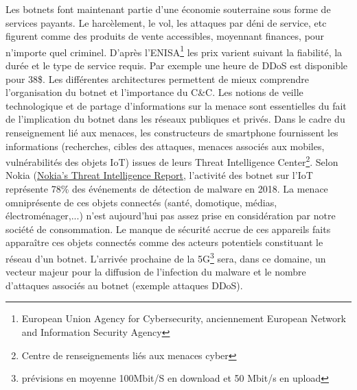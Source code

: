 Les botnets font maintenant partie d'une économie souterraine sous forme de services payants.
Le harcèlement, le vol, les attaques par déni de service, etc figurent comme des produits de vente accessibles, moyennant finances, pour n'importe quel criminel.
\newline D'après l'ENISA\footnote{European Union Agency for Cybersecurity, anciennement European Network and Information Security Agency} les prix varient suivant la fiabilité, la durée et le type de service requis.
Par exemple une heure de DDoS est disponible pour 38\$.
Les différentes architectures permettent de mieux comprendre l'organisation du botnet et l'importance du C\&C.
\vspace{5mm}
\newline Les notions de veille technologique et de partage d'informations sur la menace sont essentielles du fait de l'implication du botnet dans les réseaux publiques et privés.
\newline Dans le cadre du renseignement lié aux menaces, les constructeurs de smartphone fournissent les informations (recherches, cibles des attaques, menaces associés aux mobiles, vulnérabilités des objets IoT) issues de leurs Threat Intelligence Center\footnote{Centre de renseignements liés aux menaces cyber}.
\vspace{5mm}
\newline Selon Nokia (\href{https://www.nokia.com/about-us/news/releases/2018/12/04/nokias-threat-intelligence-report-2019-warns-on-the-fast-growing-and-evolving-threat-of-malicious-software-targeting-internet-of-things-iot-devices/}{Nokia's Threat Intelligence Report}, l'activité des botnet sur l'IoT représente 78\% des événements de détection de malware en 2018.
\newline La menace omniprésente de ces objets connectés (santé, domotique, médias, électroménager,...) n'est aujourd'hui pas assez prise en considération par notre société de consommation.
Le manque de sécurité accrue de ces appareils faits apparaître ces objets connectés comme des acteurs potentiels constituant le réseau d'un botnet.
\newline L'arrivée prochaine de la 5G\footnote{prévisions en moyenne 100Mbit/S en download et 50 Mbit/s en upload} sera, dans ce domaine, un vecteur majeur pour la diffusion de l'infection du malware et le nombre d'attaques associés au botnet (exemple attaques DDoS).


